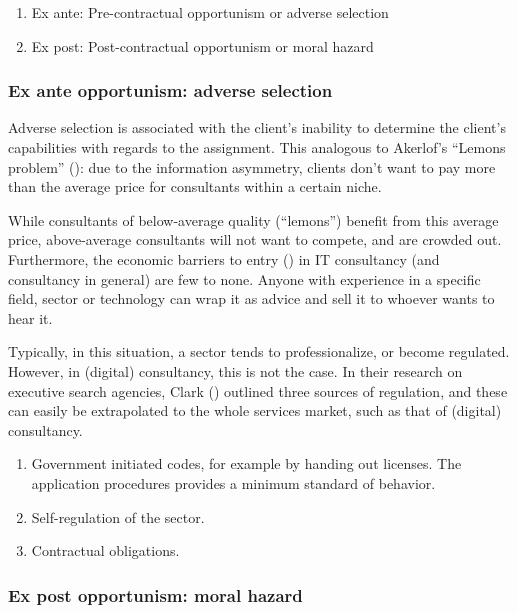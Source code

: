 \documentclass[
  man,floatsintext]{apa6}
\providecommand{\tightlist}{%
  \setlength{\itemsep}{0pt}\setlength{\parskip}{0pt}}
\begin{document}
\begin{enumerate}
\def\labelenumi{\arabic{enumi}.}
\tightlist
\item
  Ex ante: Pre-contractual opportunism or adverse selection
\item
  Ex post: Post-contractual opportunism or moral hazard
\end{enumerate}

\subsubsection{Ex ante opportunism: adverse selection}\label{ex-ante-opportunism-adverse-selection}

Adverse selection is associated with the client's inability to determine the client's capabilities with regards to the assignment. This analogous to Akerlof's ``Lemons problem'' (): due to the information asymmetry, clients don't want to pay more than the average price for consultants within a certain niche.

While consultants of below-average quality (``lemons'') benefit from this average price, above-average consultants will not want to compete, and are crowded out. Furthermore, the economic barriers to entry () in IT consultancy (and consultancy in general) are few to none. Anyone with experience in a specific field, sector or technology can wrap it as advice and sell it to whoever wants to hear it.

Typically, in this situation, a sector tends to professionalize, or become regulated. However, in (digital) consultancy, this is not the case. In their research on executive search agencies, Clark () outlined three sources of regulation, and these can easily be extrapolated to the whole services market, such as that of (digital) consultancy.

\begin{enumerate}
\def\labelenumi{\arabic{enumi}.}
\tightlist
\item
  Government initiated codes, for example by handing out licenses. The application procedures provides a minimum standard of behavior.
\item
  Self-regulation of the sector.
\item
  Contractual obligations.
\end{enumerate}

\subsubsection{Ex post opportunism: moral hazard}\label{ex-post-opportunism-moral-hazard}
\end{document}
